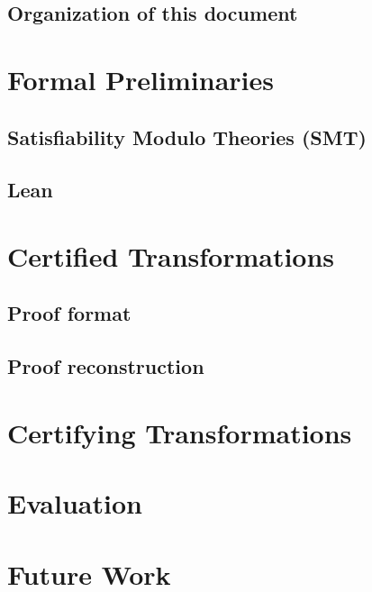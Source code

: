 \documentclass[
	msc,
	english
]{ppgccufmg}
\begin{document}
	  \section{Organization of this document}
	    
	\chapter{Formal Preliminaries}\label{chap:formalPrelim}
      \section{Satisfiability Modulo Theories (SMT)}\label{sec:smt}
        
    \section{Lean}
        
    \chapter{Certified Transformations}\label{chap:certified}
    
      \section{Proof format}\label{sec:gen-scripts}
        
      \section{Proof reconstruction}\label{sec:certified_rcons}
        
    \chapter{Certifying Transformations}\label{chap:rcons}
        
	\chapter{Evaluation}\label{chap:eval}
      
	\chapter{Future Work}\label{chap:future}
      
\end{document}
